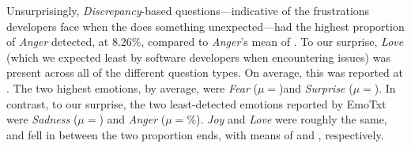 Unsurprisingly, \textit{Discrepancy}-based questions---indicative of the frustrations developers face when the  does something unexpected---{had the highest proportion of \textit{Anger} detected}, at 8.26\%, compared to \textit{Anger}'s mean of \SEMPctAngerAverage{}. To our surprise, {\textit{Love} (which we expected least by software developers when encountering issues) was present across all of the different question types}. On average, this was reported at \SEMPctLoveAverage{}. {The two highest emotions, by average, were \textit{Fear} ($\mu=$\SEMPctFearAverage{})and \textit{Surprise} ($\mu=$\SEMPctSurpriseAverage{})}. In contrast, to our surprise, {the two least-detected emotions reported by EmoTxt were \textit{Sadness} ($\mu=$\SEMPctSadnessAverage{}) and \textit{Anger} ($\mu=$\SEMPctAngerAverage{}\%)}. { \textit{Joy} and \textit{Love} were roughly the same}, and fell in between the two proportion ends, with means of \SEMPctJoyAverage{} and \SEMPctLoveAverage{}, respectively.

